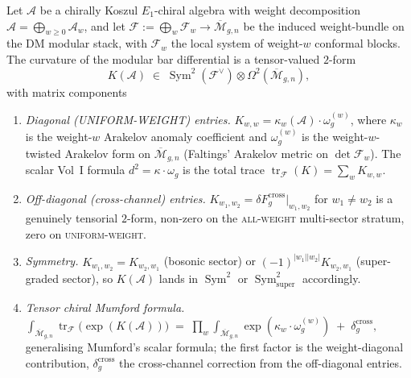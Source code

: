 \documentclass[11pt]{article}
\begin{document}
\begin{theorem}
\label{thm:theoremD-tensor-arakelov}
Let $\mathcal{A}$ be a chirally Koszul $E_1$-chiral algebra with
weight decomposition $\mathcal{A} = \bigoplus_{w \ge 0}
\mathcal{A}_w$, and let
$\mathcal{F} := \bigoplus_w \mathcal{F}_w \to
\overline{\mathcal{M}}_{g,n}$ be the induced weight-bundle on the
DM modular stack, with $\mathcal{F}_w$ the local system of
weight-$w$ conformal blocks. The curvature of the modular bar
differential is a tensor-valued $2$-form
\[
  K(\mathcal{A}) \;\in\;
  \operatorname{Sym}^2(\mathcal{F}^\vee)
  \otimes \Omega^2(\overline{\mathcal{M}}_{g,n}),
\]
with matrix components
\begin{enumerate}
\item\label{td-i} \emph{Diagonal (UNIFORM-WEIGHT) entries.}
  $K_{w,w} = \kappa_w(\mathcal{A}) \cdot \omega_g^{(w)}$, where
  $\kappa_w$ is the weight-$w$ Arakelov anomaly coefficient and
  $\omega_g^{(w)}$ is the weight-$w$-twisted Arakelov form on
  $\overline{\mathcal{M}}_{g,n}$ (Faltings' Arakelov metric on
  $\det \mathcal{F}_w$). The scalar Vol~I formula
  $d^2 = \kappa \cdot \omega_g$ is the total trace
  $\operatorname{tr}_\mathcal{F}(K) = \sum_w K_{w,w}$.
\item\label{td-ii} \emph{Off-diagonal (cross-channel) entries.}
  $K_{w_1, w_2} = \delta F_g^{\mathrm{cross}}|_{w_1, w_2}$ for
  $w_1 \ne w_2$ is a genuinely tensorial $2$-form, non-zero on the
  \textsc{all-weight} multi-sector stratum, zero on
  \textsc{uniform-weight}.
\item\label{td-iii} \emph{Symmetry.}
  $K_{w_1, w_2} = K_{w_2, w_1}$ (bosonic sector) or
  $(-1)^{|w_1||w_2|} K_{w_2, w_1}$ (super-graded sector), so
  $K(\mathcal{A})$ lands in $\operatorname{Sym}^2$ or
  $\operatorname{Sym}^2_{\mathrm{super}}$ accordingly.
\item\label{td-iv} \emph{Tensor chiral Mumford formula.}
$
  \int_{\overline{\mathcal{M}}_{g,n}} \operatorname{tr}_\mathcal{F}
  \bigl(\exp(K(\mathcal{A}))\bigr)
  \;=\;
  \prod_w
  \int_{\overline{\mathcal{M}}_{g,n}} \exp(\kappa_w \cdot
  \omega_g^{(w)})
  \;+\; \delta^{\mathrm{cross}}_g,
$
\noindent
generalising Mumford's scalar formula; the first factor is the
weight-diagonal contribution, $\delta^{\mathrm{cross}}_g$ the
cross-channel correction from the off-diagonal entries.
\end{enumerate}
\end{theorem}
\end{document}

